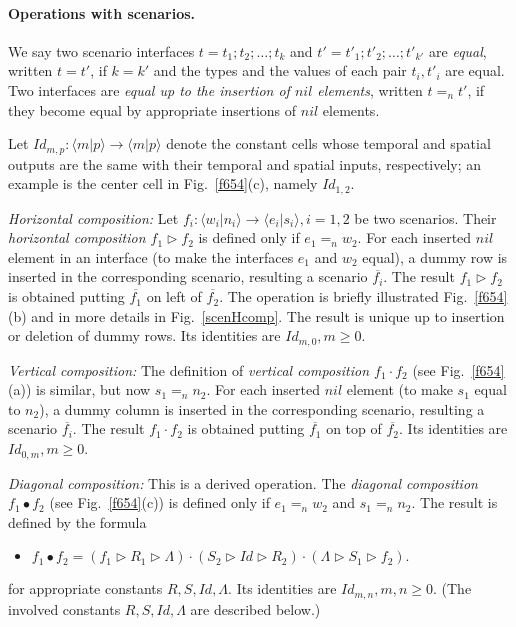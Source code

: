 \documentclass[runningheads]{llncs}
\newcommand{\1}{\u{a}}
\newcommand{\2}{\c{s}}
\newcommand{\5}{\c{t}}
\newcommand{\8}{\^{\i}}
\newcommand{\9}{\^{a}}
\newcommand{\comp}{\cdot}
\newcommand{\ol}{\overline}
\newcommand{\bi}{\begin{itemize}}
\newcommand{\ei}{\end{itemize}}
\newcommand{\ra}{\rightarrow}
\newcommand{\vcomp}{\comp}
\newcommand{\hcomp}{\triangleright}
\newcommand{\dcomp}{\bullet}\newcommand{\dstar}{^\bullet}
\newcommand{\tsrv}[4]{\langle #1|#2\rangle\ra\langle #3|#4\rangle}
\begin{document}
\paragraph{Operations with scenarios.}

We say two scenario interfaces $t=t_1;t_2;\dots;t_k$ and $t'=t'_1;t'_2;\dots;t'_{k'}$ are {\em equal}, written
$t=t'$, if $k=k'$ and the types and the values of each pair $t_i,t'_i$ are equal. Two interfaces are {\em
  equal up to the insertion of $nil$ elements}, written $t=_nt'$, if they become equal by appropriate
insertions of $nil$ elements.

Let $Id_{m,p}:\tsrv{m}{p}{m}{p}$ denote the constant cells whose temporal and spatial outputs are the same
with their temporal and spatial inputs, respectively; an example is the center cell in
Fig.~\ref{f654}(c), namely $Id_{1,2}$.

{\em Horizontal composition:} Let $f_i:\tsrv{w_i}{n_i}{e_i}{s_i}, i=1,2$ be two scenarios. Their {\em
  horizontal composition $f_1\hcomp f_2$} is defined only if $e_1=_nw_2$. For each inserted $nil$ element in
an interface (to make the interfaces $e_1$ and $w_2$ equal), a dummy row is inserted in the corresponding
scenario, resulting a scenario $\ol{f_i}$. The result $f_1\hcomp f_2$ is obtained putting $\ol{f_1}$ on left
of $\ol{f_2}$. The operation is briefly illustrated Fig.~\ref{f654}(b) and in more details in
Fig.~\ref{scenHcomp}.  The result is unique up to insertion or deletion of dummy rows. Its identities are
$Id_{m,0}, m\geq 0$.

{\em Vertical composition:} The definition of {\em vertical composition $f_1\vcomp f_2$} (see
Fig.~\ref{f654}(a)) is similar, but now $s_1=_nn_2$. For each inserted $nil$ element (to make $s_1$ equal to
$n_2$), a dummy column is inserted in the corresponding scenario, resulting a scenario $\ol{f_i}$. The result
$f_1\vcomp f_2$ is obtained putting $\ol{f_1}$ on top of $\ol{f_2}$.  Its identities are $Id_{0,m}, m\geq 0$.

{\em Diagonal composition:} This is a derived operation. The {\em diagonal composition $f_1\dcomp f_2$} (see
Fig.~\ref{f654}(c)) is defined only if $e_1=_nw_2$ and $s_1=_nn_2$. The result is defined by the formula\bi
\item[] $f_1\dcomp f_2 =(f_1\hcomp R_1\hcomp \Lambda)\vcomp(S_2\hcomp Id \hcomp R_2)\vcomp(\Lambda \hcomp
  S_1\hcomp f_2).$\ei for appropriate constants $R,S,Id,\Lambda$. Its identities are $Id_{m,n}, m,n\geq
  0$. (The involved constants $R,S,Id,\Lambda$ are described below.)
\end{document}
